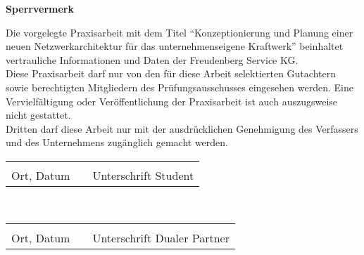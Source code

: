 \begin{centering}
\textbf{\Huge Sperrvermerk}\\
\end{centering}
\vspace{1.5cm}

\begin{doublespacing}
Die vorgelegte Praxisarbeit mit dem Titel "`Konzeptionierung und Planung einer neuen Netzwerkarchitektur für das unternehmenseigene Kraftwerk"' beinhaltet vertrauliche Informationen und Daten der Freudenberg Service KG.\\ 

Diese Praxisarbeit darf nur von den für diese Arbeit selektierten Gutachtern sowie berechtigten Mitgliedern des Prüfungsausschusses eingesehen werden. Eine Vervielfältigung oder Veröffentlichung der Praxisarbeit 
ist auch auszugsweise nicht gestattet.\\

Dritten darf diese Arbeit nur mit der ausdrücklichen Genehmigung des Verfassers und des Unternehmens zugänglich gemacht werden. 
\end{doublespacing}
\vspace{2cm}

\begin{tabular}{lp{12em}l}
\hspace{5cm}  && \hspace{5cm} \\\cline{1-1}\cline{3-3}
Ort, Datum    && Unterschrift Student
\end{tabular}\\

\vspace{2cm}

\begin{tabular}{lp{12em}l}
\hspace{5cm}  && \hspace{5cm} \\\cline{1-1}\cline{3-3}
Ort, Datum    && Unterschrift Dualer Partner
\end{tabular}\\